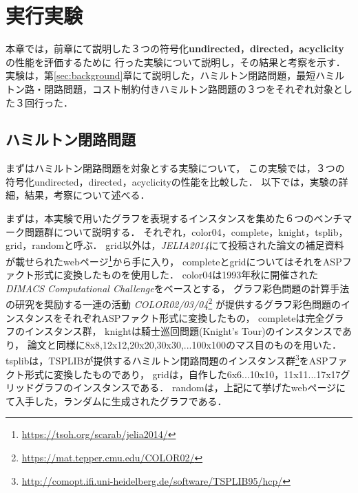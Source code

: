 \chapter{実行実験}
本章では，前章にて説明した３つの符号化\textbf{undirected}，\textbf{directed}，\textbf{acyclicity}の性能を評価するために
行った実験について説明し，その結果と考察を示す．
実験は，第\ref{sec:background}章にて説明した，ハミルトン閉路問題，最短ハミルトン路・閉路問題，コスト制約付きハミルトン路問題の３つをそれぞれ対象とした３回行った．
\section{ハミルトン閉路問題}
まずはハミルトン閉路問題を対象とする実験について，
この実験では，３つの符号化undirected，directed，acyclicityの性能を比較した．
以下では，実験の詳細，結果，考察について述べる．

まずは，本実験で用いたグラフを表現するインスタンスを集めた６つのベンチマーク問題群について説明する．
それぞれ，color04，complete，knight，tsplib，grid，randomと呼ぶ．
grid以外は，\textit{JELIA2014}にて投稿された論文\cite{soh14}の補足資料
が載せられたwebページ\footnote{\url{https://tsoh.org/scarab/jelia2014/}}から手に入り，
completeとgridについてはそれをASPファクト形式に変換したものを使用した．
color04は1993年秋に開催された\textit{DIMACS Computational Challenge}をベースとする，
グラフ彩色問題の計算手法の研究を奨励する一連の活動
\textit{COLOR02/03/04}\footnote{\url{https://mat.tepper.cmu.edu/COLOR02/}}
が提供するグラフ彩色問題のインスタンスをそれぞれASPファクト形式に変換したもの，
completeは完全グラフのインスタンス群，
knightは騎士巡回問題(Knight's Tour)のインスタンスであり，
論文\cite{soh14}と同様に8x8,12x12,20x20,30x30,...100x100のマス目のものを用いた．
tsplibは，TSPLIBが提供するハミルトン閉路問題のインスタンス群\footnote{\url{http://comopt.ifi.uni-heidelberg.de/software/TSPLIB95/hcp/}}をASPファクト形式に変換したものであり，
gridは，自作した6x6...10x10，11x11...17x17グリッドグラフのインスタンスである．
randomは，上記にて挙げたwebページ\footnotemark[1]にて入手した，ランダムに生成されたグラフである．

